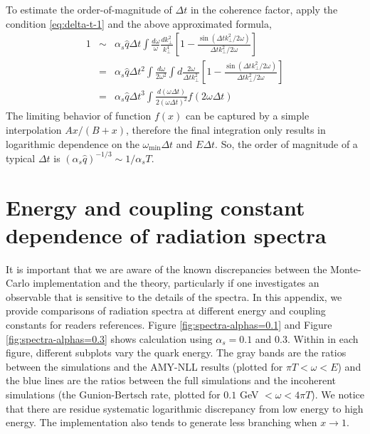 \documentclass[aps, prc, reprint, amsmath, groupedaddress, nofootinbib]{revtex4-1}
\begin{document}
To estimate the order-of-magnitude of $\Delta t$ in the coherence factor, apply the condition \ref{eq:delta-t-1} and the above approximated formula,
\begin{eqnarray}
\nonumber
1 &\sim& \alpha_s\hat{q}\Delta t \int \frac{d\omega}{\omega}  \frac{dk_\perp^2}{k_\perp^4}  \left[1-\frac{\sin(\Delta t k_\perp^2/2\omega)}{\Delta t k_\perp^2/2\omega}\right]\\
\nonumber
&=& \alpha_s\hat{q}\Delta t^2 \int \frac{d\omega}{2\omega^2}  \int d\frac{2\omega}{\Delta t k_\perp^2}  \left[1-\frac{\sin(\Delta t k_\perp^2/2\omega)}{\Delta t k_\perp^2/2\omega}\right]\\
&=& \alpha_s\hat{q}\Delta t^3 \int \frac{d(\omega\Delta t)}{2(\omega\Delta t) ^2} f(2\omega\Delta t)
\end{eqnarray}
The limiting behavior of function $f(x)$ can be captured by a simple interpolation $Ax/(B+x)$, therefore the final integration only results in logarithmic dependence on the $\omega_{\min}\Delta t$ and $E\Delta t$.
So, the order of magnitude of a typical $\Delta t$ is $(\alpha_s\hat{q})^{-1/3}\sim 1/\alpha_s T$.


\section{Energy and coupling constant dependence of radiation spectra}\label{app:tune-spectrum}
It is important that we are aware of the known discrepancies between the Monte-Carlo implementation and the theory, particularly if one investigates an observable that is sensitive to the details of the spectra. 
In this appendix, we provide comparisons of radiation spectra at different energy and coupling constants for readers references.
Figure \ref{fig:spectra-alphas=0.1} and Figure \ref{fig:spectra-alphas=0.3} shows calculation using $\alpha_s = 0.1$ and $0.3$.
Within in each figure, different subplots vary the quark energy.
The gray bands are the ratios between the simulations and the AMY-NLL results (plotted for $\pi T < \omega < E$) and the blue lines are the ratios between the full simulations and the incoherent simulations (the Gunion-Bertsch rate, plotted for $0.1$ GeV $< \omega < 4\pi T $).
We notice that there are residue systematic logarithmic discrepancy from low energy to high energy.
The implementation also tends to generate less branching when $x \rightarrow 1$.

\newpage

 
\end{document}
